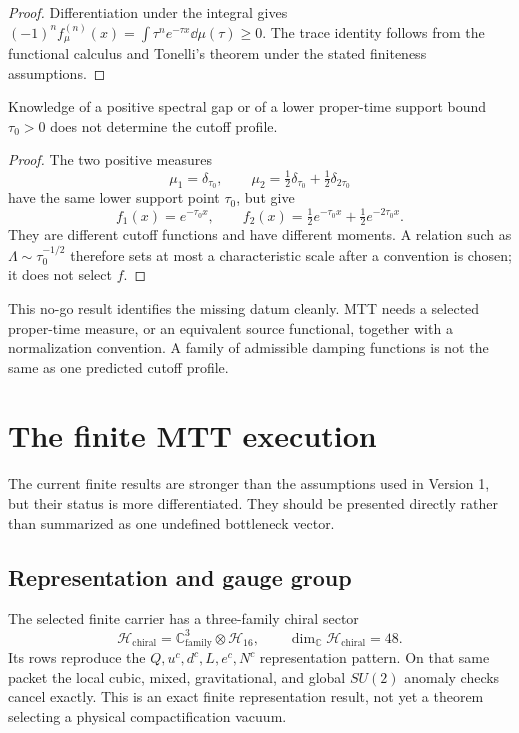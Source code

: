 \documentclass[11pt]{article}
\begin{document}
\begin{proof}
Differentiation under the integral gives
$(-1)^n f_\mu^{(n)}(x)=\int \tau^n e^{-\tau x}\dd\mu(\tau)\geq0$.
The trace identity follows from the functional calculus and Tonelli's theorem
under the stated finiteness assumptions.
\end{proof}

\begin{proposition}\label{prop:no-gap}
Knowledge of a positive spectral gap or of a lower proper-time support bound
$\tau_0>0$ does not determine the cutoff profile.
\end{proposition}

\begin{proof}
The two positive measures
\[
  \mu_1=\delta_{\tau_0},
  \qquad
  \mu_2=\tfrac12\delta_{\tau_0}+\tfrac12\delta_{2\tau_0}
\]
have the same lower support point $\tau_0$, but give
\[
 f_1(x)=e^{-\tau_0x},
 \qquad
 f_2(x)=\tfrac12e^{-\tau_0x}+\tfrac12e^{-2\tau_0x}.
\]
They are different cutoff functions and have different moments.  A relation
such as $\Lambda\sim\tau_0^{-1/2}$ therefore sets at most a characteristic
scale after a convention is chosen; it does not select $f$.
\end{proof}

This no-go result identifies the missing datum cleanly.  MTT needs a selected
proper-time measure, or an equivalent source functional, together with a
normalization convention.  A family of admissible damping functions is not the
same as one predicted cutoff profile.

\section{The finite MTT execution}

The current finite results are stronger than the assumptions used in Version
1, but their status is more differentiated.  They should be presented
directly rather than summarized as one undefined bottleneck vector.

\subsection{Representation and gauge group}

The selected finite carrier has a three-family chiral sector
\[
  \mathcal{H}_{\mathrm{chiral}}
   =\mathbb{C}^3_{\mathrm{family}}\otimes\mathcal{H}_{16},
  \qquad \dim_\mathbb{C}\mathcal{H}_{\mathrm{chiral}}=48.
\]
Its rows reproduce the $Q,u^c,d^c,L,e^c,N^c$ representation pattern.  On that
same packet the local cubic, mixed, gravitational, and global $SU(2)$ anomaly
checks cancel exactly.  This is an exact finite representation result, not yet
a theorem selecting a physical compactification vacuum.
\end{document}
